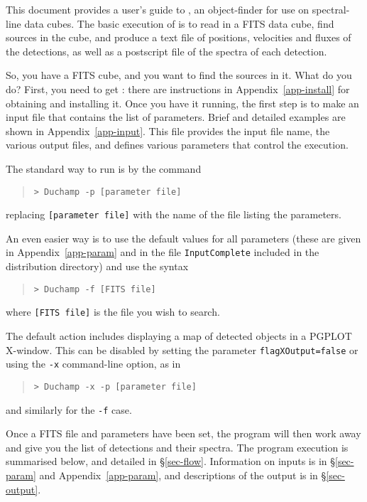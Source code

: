 
This document provides a user's guide to \duchamp, an object-finder
for use on spectral-line data cubes. The basic execution of \duchamp
is to read in a FITS data cube, find sources in the cube, and produce
a text file of positions, velocities and fluxes of the detections, as
well as a postscript file of the spectra of each detection.


So, you have a FITS cube, and you want to find the sources in it. What
do you do? First, you need to get \duchamp: there are instructions in
Appendix~\ref{app-install} for obtaining and installing it. Once you
have it running, the first step is to make an input file that contains
the list of parameters. Brief and detailed examples are shown in
Appendix~\ref{app-input}. This file provides the input file name, the
various output files, and defines various parameters that control the
execution.

The standard way to run \duchamp is by the command
\begin{quote}
{\footnotesize
\texttt{> Duchamp -p [parameter file]}
}
\end{quote}
replacing \texttt{[parameter file]} with the name of the file listing
the parameters. 

An even easier way is to use the default values for all parameters
(these are given in Appendix~\ref{app-param} and in the file
\texttt{InputComplete} included in the distribution directory) and use
the syntax
\begin{quote}
{\footnotesize
\texttt{> Duchamp -f [FITS file]}
}
\end{quote}
where \texttt{[FITS file]} is the file you wish to search. 

The default action includes displaying a map of detected objects in a
PGPLOT X-window. This can be disabled by setting the parameter
\texttt{flagXOutput=false} or using the \texttt{-x} command-line
option, as in
\begin{quote}
{\footnotesize
\texttt{> Duchamp -x -p [parameter file]}
}
\end{quote}
and similarly for the \texttt{-f} case.

Once a FITS file and parameters have been set, the program will then
work away and give you the list of detections and their spectra. The
program execution is summarised below, and detailed in
\S\ref{sec-flow}. Information on inputs is in \S\ref{sec-param} and
Appendix~\ref{app-param}, and descriptions of the output is in
\S\ref{sec-output}.

